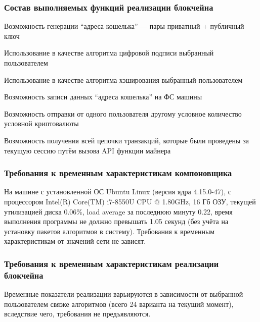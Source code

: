 \subsubsection{Состав выполняемых функций реализации блокчейна}
\begin{my_enumerate}
    \item Возможность генерации ``адреса кошелька'' --- пары приватный + публичный ключ
    \item Использование в качестве алгоритма цифровой подписи выбранный пользователем
    \item Использование в качестве алгоритма хэширования выбранный пользователем
    \item Возможность записи данных ``адреса кошелька'' на ФС машины
    \item Возможность отправки от одного пользователя другому условное
          количество условной криптовалюты
    \item Возможность получения всей цепочки транзакций, которые были проведены
          за текущую сессию путём вызова API функции майнера
\end{my_enumerate}

\subsubsection{Требования к временным характеристикам компоновщика}
На машине с установленной ОС Ubuntu Linux (версия ядра 4.15.0-47), с
процессором Intel(R) Core(TM) i7-8550U CPU @ 1.80GHz, 16 Гб ОЗУ, текущей
утилизацией диска 0.06\%, load average за последнюю минуту 0.22, время
выполнения программы не должно превышать 1.05 секунд (без учёта на установку
пакетов алгоритмов в систему). Требования к временным характеристикам от
значений сети не зависят.

\subsubsection{Требования к временным характеристикам реализации блокчейна}
Временные показатели реализации варьируются в зависимости от выбранной
пользователем связке алгоритмов (всего 24 варианта на текущий момент),
вследствие чего, требования не предъявляются.

